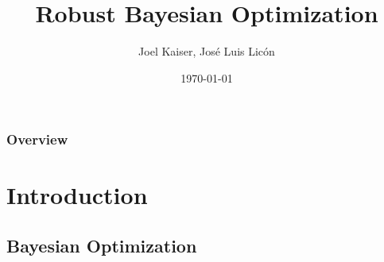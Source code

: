 \documentclass[10pt,handout]{beamer}
\title[RoBO]
{Robust Bayesian Optimization}
\author{Joel Kaiser, José Luis Licón}
\institute[Uni Freiburg] %
{
Albert-Ludwigs-Universität Freiburg \\ %
\medskip
}
\date{\today} %
\begin{document}



\begin{frame}
\titlepage %
\end{frame}

\begin{frame}
\frametitle{Overview} %
\tableofcontents %
\end{frame}


\section{Introduction}


\subsection{Bayesian Optimization}


  

% 


\end{document}
